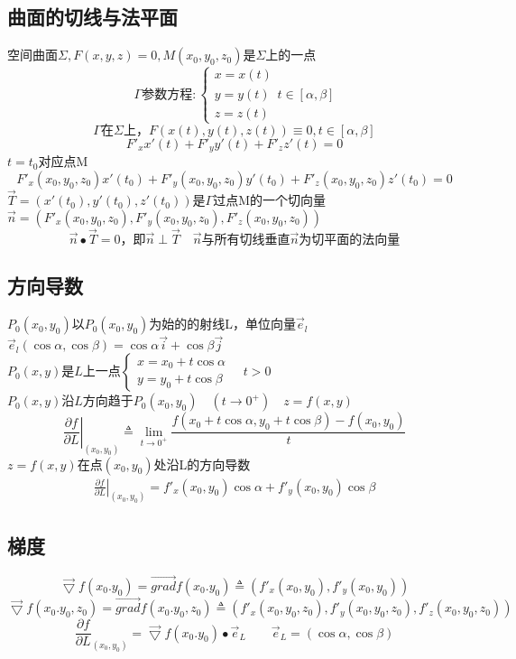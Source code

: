 \subsection{曲面的切线与法平面}
空间曲面$\Sigma,F(x,y,z)=0,M(x_0,y_0,z_0)$是$\Sigma$上的一点\\
$$\Gamma\mbox{参数方程}:\begin{cases}
	x=x(t)\\
	y=y(t)\\
	z=z(t)
\end{cases}t\in[\alpha,\beta]$$
$$\Gamma\mbox{在}\Sigma\mbox{上}，F(x(t),y(t),z(t))\equiv 0,t\in[\alpha,\beta]$$
$$F'_xx'(t)+F'_yy'(t)+F'_zz'(t)=0$$
$t=t_0$\mbox{对应点}M
$$F'_x(x_0,y_0,z_0)x'(t_0)+F'_y(x_0,y_0,z_0)y'(t_0)+F'_z(x_0,y_0,z_0)z'(t_0)=0$$
$\overrightarrow{T}=(x'(t_0),y'(t_0),z'(t_0))$是$\Gamma$过点M的一个切向量\\
$\overrightarrow{n}=(F'_x(x_0,y_0,z_0),F'_y(x_0,y_0,z_0),F'_z(x_0,y_0,z_0))$
$$\overrightarrow{n}\bullet\overrightarrow{T}=0\mbox{，即}\overrightarrow{n}\perp\overrightarrow{T}\quad\overrightarrow{n}\mbox{与所有切线垂直}\overrightarrow{n}\mbox{为切平面的法向量}$$
\subsection{方向导数}
$P_0(x_0,y_0)$以$P_0(x_0,y_0)$为始的的射线L，单位向量$\overrightarrow{e}_l$\\
$\overrightarrow{e}_l(\cos\alpha,\cos\beta)=\cos\alpha\overrightarrow{i}+\cos\beta\overrightarrow{j}$\\
$P_0(x,y)$是$L$上一点$\begin{cases}
	x=x_0+t\cos\alpha\\
	y=y_0+t\cos\beta
\end{cases}\quad t>0$\\
$P_0(x,y)$沿$L$方向趋于$P_0(x_0,y_0)\quad(t\to 0^+)\quad z=f(x,y)$\\
$$\left.\frac{\partial f}{\partial L}\right|_{(x_0,y_0)}\triangleq\lim\limits_{t\to 0^+}\frac{f(x_0+t\cos\alpha,y_0+t\cos\beta)-f(x_0,y_0)}{t}$$
$z=f(x,y)$在点$(x_0,y_0)$处沿L的方向导数
\begin{align}
	\left.\frac{\partial f}{\partial L}\right|_{(x_0,y_0)}=f'_x(x_0,y_0)\cos\alpha+f'_y(x_0,y_0)\cos\beta\label{Directional_derivative}
\end{align}
\subsection{梯度}
$$\overrightarrow{\bigtriangledown} f(x_0.y_0)=\overrightarrow{grad}f(x_0.y_0)\triangleq\left(f'_x(x_0,y_0),f'_y(x_0,y_0)\right)$$
$$\overrightarrow{\bigtriangledown} f(x_0.y_0,z_0)=\overrightarrow{grad}f(x_0.y_0,z_0)\triangleq\left(f'_x(x_0,y_0,z_0),f'_y(x_0,y_0,z_0),f'_z(x_0,y_0,z_0)\right)$$
$$\frac{\partial f}{\partial L}_{(x_0,y_0)}=\overrightarrow{\bigtriangledown} f(x_0.y_0)\bullet\overrightarrow{e}_L\qquad\overrightarrow{e}_L=(\cos\alpha,\cos\beta)$$
